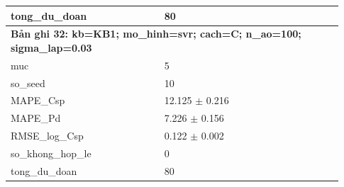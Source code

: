 \begin{longtable}{p{0.43\linewidth}p{0.50\linewidth}}
tong\_\allowbreak du\_\allowbreak doan & 80 \\
\midrule
\multicolumn{2}{p{0.95\linewidth}}{\textbf{Bản ghi 32: kb=KB1; mo\_hinh=svr; cach=C; n\_ao=100; sigma\_lap=0.03}} \\
muc & 5 \\
so\_\allowbreak seed & 10 \\
MAPE\_\allowbreak Csp & 12.125 $\pm$ 0.216 \\
MAPE\_\allowbreak Pd & 7.226 $\pm$ 0.156 \\
RMSE\_\allowbreak log\_\allowbreak Csp & 0.122 $\pm$ 0.002 \\
so\_\allowbreak khong\_\allowbreak hop\_\allowbreak le & 0 \\
tong\_\allowbreak du\_\allowbreak doan & 80 \\
\midrule
\bottomrule
\end{longtable}
